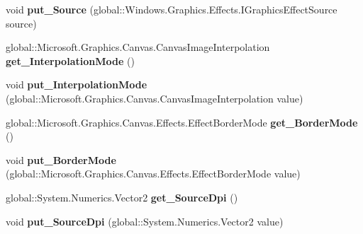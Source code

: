 \begin{DoxyCompactItemize}
void {\bfseries put\+\_\+\+Source} (global\+::\+Windows.\+Graphics.\+Effects.\+I\+Graphics\+Effect\+Source source)
\item 
\mbox{\label{interface_microsoft_1_1_graphics_1_1_canvas_1_1_effects_1_1_i_dpi_compensation_effect_ac5e4888783e519ac1ef3cca2949f28c8}} 
global\+::\+Microsoft.\+Graphics.\+Canvas.\+Canvas\+Image\+Interpolation {\bfseries get\+\_\+\+Interpolation\+Mode} ()
\item 
\mbox{\label{interface_microsoft_1_1_graphics_1_1_canvas_1_1_effects_1_1_i_dpi_compensation_effect_a9dc002b657a33313f9c1e53d96297e13}} 
void {\bfseries put\+\_\+\+Interpolation\+Mode} (global\+::\+Microsoft.\+Graphics.\+Canvas.\+Canvas\+Image\+Interpolation value)
\item 
\mbox{\label{interface_microsoft_1_1_graphics_1_1_canvas_1_1_effects_1_1_i_dpi_compensation_effect_a76445b947278b23789ac880d8cc5fc6a}} 
global\+::\+Microsoft.\+Graphics.\+Canvas.\+Effects.\+Effect\+Border\+Mode {\bfseries get\+\_\+\+Border\+Mode} ()
\item 
\mbox{\label{interface_microsoft_1_1_graphics_1_1_canvas_1_1_effects_1_1_i_dpi_compensation_effect_ade5071aec175affb5d564c3ff21ab872}} 
void {\bfseries put\+\_\+\+Border\+Mode} (global\+::\+Microsoft.\+Graphics.\+Canvas.\+Effects.\+Effect\+Border\+Mode value)
\item 
\mbox{\label{interface_microsoft_1_1_graphics_1_1_canvas_1_1_effects_1_1_i_dpi_compensation_effect_a52343f4e5f636dfc6a505f71e277c49f}} 
global\+::\+System.\+Numerics.\+Vector2 {\bfseries get\+\_\+\+Source\+Dpi} ()
\item 
\mbox{\label{interface_microsoft_1_1_graphics_1_1_canvas_1_1_effects_1_1_i_dpi_compensation_effect_ae37090d897dfa337b42f53e5dc0b69bd}} 
void {\bfseries put\+\_\+\+Source\+Dpi} (global\+::\+System.\+Numerics.\+Vector2 value)

\end{DoxyCompactItemize}
